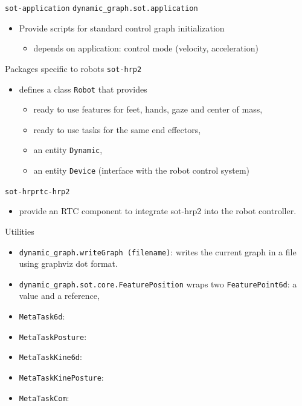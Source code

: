 %
%

\begin{frame} {\texttt{sot-application}}
  \texttt{dynamic\_graph.sot.application} 
  \begin{itemize}
  \item Provide scripts for standard control graph initialization
    \begin{itemize}
      \item depends on application: control mode (velocity, acceleration)
    \end{itemize}
  \end{itemize}
\end{frame}

%
%
\begin{frame} {Packages specific to robots}
  \texttt{sot-hrp2}
  \begin{itemize}
  \item defines a class \texttt{Robot} that provides
    \begin{itemize}
      \item ready to use features for feet, hands, gaze and center of mass,
      \item ready to use tasks for the same end effectors,
      \item an entity \texttt{Dynamic},
      \item an entity \texttt{Device} (interface with the robot control system)
    \end{itemize}
  \end{itemize}
  \texttt {sot-hrprtc-hrp2}
  \begin{itemize}
  \item provide an RTC component to integrate sot-hrp2 into the robot controller.
  \end{itemize}
\end{frame}

%
%
\begin {frame} {Utilities}
  \begin{itemize}
  \item \texttt{dynamic\_graph.writeGraph (filename)}: writes the current graph in a file using graphviz dot format.
    \pause
  \item \texttt {dynamic\_graph.sot.core.FeaturePosition} wraps two \texttt{FeaturePoint6d}: a value and a reference,
    \pause
  \item \texttt{MetaTask6d}:
    \pause
  \item \texttt{MetaTaskPosture}:
    \pause
  \item \texttt{MetaTaskKine6d}:
    \pause
  \item \texttt{MetaTaskKinePosture}:
    \pause
  \item \texttt{MetaTaskCom}:
  \end{itemize}
\end{frame}

